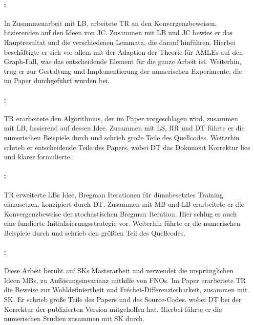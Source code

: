 \paragraph{\cite{bungert2021uniform}:} In Zusammenarbeit mit LB, arbeitete TR an den Konvergenzbeweisen,\\ basierenden auf den Ideen von JC. Zusammen mit LB und JC bewies er das Hauptresultat und die verschiedenen Lemmata, die darauf hinführen. Hierbei beschäftigte er sich vor allem mit der Adaption der Theorie für AMLEs auf den Graph-Fall, was das entscheidende Element für die ganze Arbeit ist. Weiterhin, trug er zur Gestaltung und Implementierung der numerischen Experimente, die im Paper durchgeführt wurden bei. 

\paragraph{\cite{bungert2021clip}:} TR erarbeitete den Algorithmus, der im Paper vorgeschlagen wird, zusammen mit LB, basierend auf dessen Idee. Zusammen mit LS, RR und DT führte er die numerischen Beispiele durch und schrieb gro\ss{}e Teile des Quellcodes. Weiterhin schrieb er entscheidende Teile des Papers, wobei DT das Dokument Korrektur lies und klarer formulierte.

\paragraph{\cite{bungert2022bregman}:} TR erweiterte LBs Idee, Bregman Iterationen für dünnbesetztes Training einzusetzen, konzipiert durch DT. Zusammen mit MB und LB erarbeitete er die Konvergenzbeweise der stochastischen Bregman Iteration. Hier schlug er auch eine fundierte Initialisierungsstrategie vor. Weiterhin führte er die numerischen Beispiele durch und schrieb den grö\ss{}ten Teil des Quellcodes.

\paragraph{\cite{kabri2023resolution}:} Diese Arbeit beruht auf SKs Masterarbeit und verwendet die ursprünglichen Ideen MBs, zu Auflösungsinvarianz mithilfe von FNOs. Im Paper erarbeitete TR die Beweise zur Wohldefiniertheit und Fréchet-Differenzierbarkeit, zusammen mit SK. Er schrieb gro\ss{}e Teile des Papers und des Source-Codes, wobei DT bei der Korrektur der publizierten Version mitgeholfen hat. Hierbei führte er die numerischen Studien zusammen mit SK durch.
